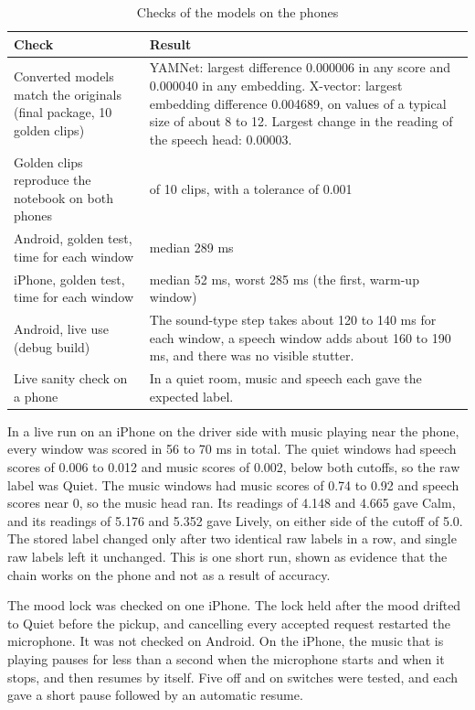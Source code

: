 \begin{table}[htbp]
    \centering
    \caption{Checks of the models on the phones}\label{tab:ai-phoneres}
    \small
    \renewcommand{\arraystretch}{1.2}
    \begin{tabular}{|>{\raggedright\arraybackslash}p{}|>{\raggedright\arraybackslash}p{}|}
        \hline
        \textbf{Check} & \textbf{Result} \\
        \hline
        Converted models match the originals (final package, 10 golden clips) & YAMNet: largest difference 0.000006 in any score and 0.000040 in any embedding. X-vector: largest embedding difference 0.004689, on values of a typical size of about 8 to 12. Largest change in the reading of the speech head: 0.00003. \\
        \hline
        Golden clips reproduce the notebook on both phones & 10 of 10 clips, with a tolerance of 0.001 \\
        \hline
        Android, golden test, time for each window & median 289 ms \\
        \hline
        iPhone, golden test, time for each window & median 52 ms, worst 285 ms (the first, warm-up window) \\
        \hline
        Android, live use (debug build) & The sound-type step takes about 120 to 140 ms for each window, a speech window adds about 160 to 190 ms, and there was no visible stutter. \\
        \hline
        Live sanity check on a phone & In a quiet room, music and speech each gave the expected label. \\
        \hline
    \end{tabular}
\end{table}

In a live run on an iPhone on the driver side with music playing near the phone, every window was scored in 56 to 70 ms in total. The quiet windows had speech scores of 0.006 to 0.012 and music scores of 0.002, below both cutoffs, so the raw label was Quiet. The music windows had music scores of 0.74 to 0.92 and speech scores near 0, so the music head ran. Its readings of 4.148 and 4.665 gave Calm, and its readings of 5.176 and 5.352 gave Lively, on either side of the cutoff of 5.0. The stored label changed only after two identical raw labels in a row, and single raw labels left it unchanged. This is one short run, shown as evidence that the chain works on the phone and not as a result of accuracy.

The mood lock was checked on one iPhone. The lock held after the mood drifted to Quiet before the pickup, and cancelling every accepted request restarted the microphone. It was not checked on Android. On the iPhone, the music that is playing pauses for less than a second when the microphone starts and when it stops, and then resumes by itself. Five off and on switches were tested, and each gave a short pause followed by an automatic resume.

